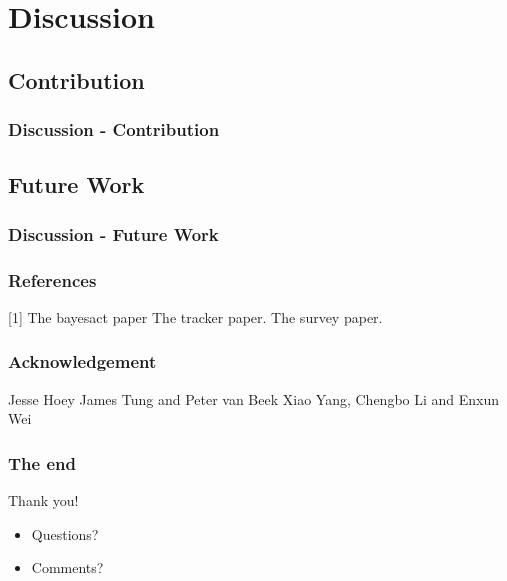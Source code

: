 \documentclass{beamer}
\begin{document}
\section{Discussion}

\subsection{Contribution}
\begin{frame}
\frametitle{Discussion - Contribution}
\end{frame}

\subsection{Future Work}
\begin{frame}
\frametitle{Discussion - Future Work}

\end{frame}

\begin{frame}
\frametitle{References}
[1] The bayesact paper
\newline [2] The tracker paper.
\newline [3] The survey paper.
\end{frame}
\begin{frame}
\frametitle{Acknowledgement}
Jesse Hoey
\newline James Tung and Peter van Beek
\newline Xiao Yang, Chengbo Li and Enxun Wei
\end{frame}
\begin{frame}
\frametitle{The end}
\Huge{\centerline{Thank you!}}   
\fontsize{5mm}{4mm}
\begin{itemize}
\item Questions?
\item Comments?
\end{itemize}
\end{frame}

\end{document}
